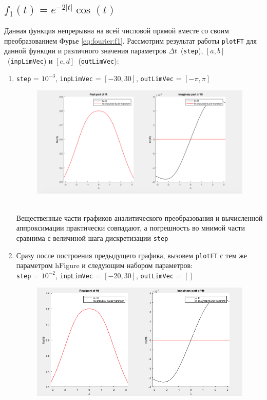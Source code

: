 \documentclass[11pt, oneside, final]{article}
\numberwithin{equation}{section}
\begin{document}
    \subsection{\(f_1(t) = e^{-2|t|} \cos(t)\)} %
    \label{sub:f1}
    Данная функция непрерывна на всей числовой прямой вместе со своим преобразованием Фурье \eqref{eq:fourier:f1}. Рассмотрим результат работы \texttt{plotFT}
    для данной функции и различного значения параметров \(\Delta t\)~(\texttt{step}), \([a, b]\)~(\texttt{inpLimVec}) и \([c, d]\)~(\texttt{outLimVec}):
    \begin{enumerate}
        \item 
        \texttt{step} = \(10^{-3}\), \texttt{inpLimVec} = \( [-30, 30] \), \texttt{outLimVec} = \( [-\pi, \pi] \)
        \begin{figure}[!h]
            \centering
            \includegraphics[width=\textwidth]{f1fig1}
            \label{pic:f1:1}
        \end{figure} \\
        Вещественные части графиков аналитического преобразования и вычисленной аппроксимации практически совпадают, а погрешность во мнимой части сравнима с величиной
        шага дискретизации \texttt{step}
        \clearpage
        \item
        Сразу после построения предыдущего графика, вызовем \texttt{plotFT} с тем же параметром hFigure и следующим набором параметров:\\
        \texttt{step} = \(10^{-2}\), \texttt{inpLimVec} = \( [-20, 30] \), \texttt{outLimVec} = \( [] \)
        \begin{figure}[!h]
            \centering
            \includegraphics[width=\textwidth]{f1fig2}

\end{figure}
\end{enumerate}
\end{document}
